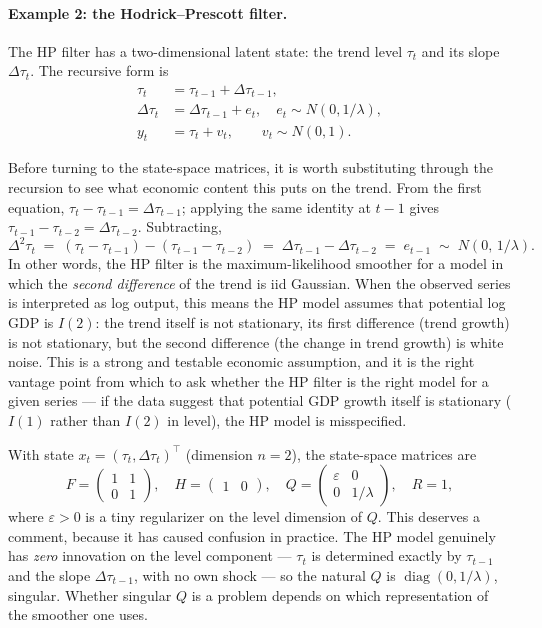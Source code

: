 \documentclass[11pt]{article}
\newcommand{\diag}{\operatorname{diag}}
\begin{document}
\paragraph{Example 2: the Hodrick--Prescott filter.}

The HP filter has a two-dimensional latent state: the trend level
$\tau_t$ and its slope $\Delta\tau_t$.  The recursive form is
\begin{align}
\tau_t        &= \tau_{t-1}+\Delta\tau_{t-1},\\
\Delta\tau_t  &= \Delta\tau_{t-1}+e_t,\quad e_t\sim N(0,1/\lambda),\\
y_t           &= \tau_t+v_t,\qquad v_t\sim N(0,1).
\end{align}

Before turning to the state-space matrices, it is worth substituting
through the recursion to see what economic content this puts on the
trend.  From the first equation, $\tau_t-\tau_{t-1}=\Delta\tau_{t-1}$;
applying the same identity at $t-1$ gives
$\tau_{t-1}-\tau_{t-2}=\Delta\tau_{t-2}$.  Subtracting,
\begin{equation}
\Delta^2\tau_t \;=\; (\tau_t-\tau_{t-1})-(\tau_{t-1}-\tau_{t-2})
\;=\; \Delta\tau_{t-1}-\Delta\tau_{t-2}
\;=\; e_{t-1} \;\sim\; N(0,\,1/\lambda).
\end{equation}
In other words, the HP filter is the maximum-likelihood smoother for
a model in which the \emph{second difference} of the trend is iid
Gaussian.  When the observed series is interpreted as log output,
this means the HP model assumes that potential log GDP is $I(2)$:
the trend itself is not stationary, its first difference (trend
growth) is not stationary, but the second difference (the change in
trend growth) is white noise.  This is a strong and testable
economic assumption, and it is the right vantage point from which to
ask whether the HP filter is the right model for a given series ---
if the data suggest that potential GDP growth itself is stationary
($I(1)$ rather than $I(2)$ in level), the HP model is misspecified.

With state $x_t=(\tau_t,\Delta\tau_t)^\top$ (dimension $n=2$), the
state-space matrices are
\begin{equation}
F=\begin{pmatrix}1 & 1\\ 0 & 1\end{pmatrix},
\quad
H=\begin{pmatrix}1 & 0\end{pmatrix},
\quad
Q=\begin{pmatrix}\varepsilon & 0\\ 0 & 1/\lambda\end{pmatrix},
\quad
R=1,
\end{equation}
where $\varepsilon>0$ is a tiny regularizer on the level dimension of
$Q$.  This deserves a comment, because it has caused confusion in
practice.  The HP model genuinely has \emph{zero} innovation on the
level component --- $\tau_t$ is determined exactly by $\tau_{t-1}$ and
the slope $\Delta\tau_{t-1}$, with no own shock --- so the natural $Q$
is $\diag(0,1/\lambda)$, singular.  Whether singular $Q$ is a problem
depends on which representation of the smoother one uses.
\end{document}
